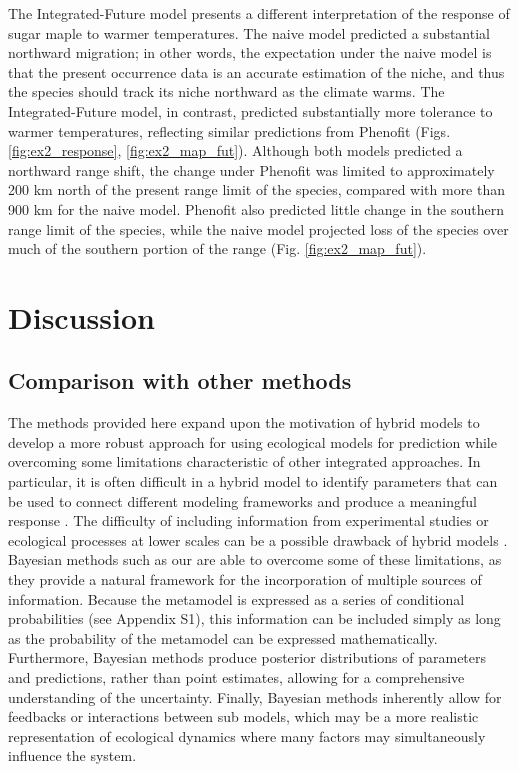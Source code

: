 \documentclass[11pt]{article}
\begin{document}
The Integrated-Future model presents a different interpretation of the response of sugar maple to warmer temperatures. 
The naive model predicted a substantial northward migration; in other words, the expectation under the naive model is that the present occurrence data is an accurate estimation of the niche, and thus the species should track its niche northward as the climate warms.
The Integrated-Future model, in contrast, predicted substantially more tolerance to warmer temperatures, reflecting similar predictions from Phenofit (Figs. \ref{fig:ex2_response}, \ref{fig:ex2_map_fut}).
Although both models predicted a northward range shift, the change under Phenofit was limited to approximately 200 km north of the present range limit of the species, compared with more than 900 km for the naive model.
Phenofit also predicted little change in the southern range limit of the species, while the naive model projected loss of the species over much of the southern portion of the range (Fig. \ref{fig:ex2_map_fut}).



%
%



\section*{Discussion}

\subsection*{Comparison with other methods}
The methods provided here expand upon the motivation of hybrid models to develop a more robust approach for using ecological models for prediction while overcoming some limitations characteristic of other integrated approaches.
In particular, it is often difficult in a hybrid model to identify parameters that can be used to connect different modeling frameworks and produce a meaningful response \citep{Thuiller2013}. 
The difficulty of including information from experimental studies or ecological processes at lower scales can be a possible drawback of hybrid models \citep{Smolik2010, Thuiller2014a}. 
Bayesian methods such as our are able to overcome some of these limitations, as they provide a natural framework for the incorporation of multiple sources of information.
Because the metamodel is expressed as a series of conditional probabilities (see Appendix S1), this information can be included simply as long as the probability of the metamodel can be expressed mathematically.
Furthermore, Bayesian methods produce posterior distributions of parameters and predictions, rather than point estimates, allowing for a comprehensive understanding of the uncertainty. 
Finally, Bayesian methods inherently allow for feedbacks or interactions between sub models, which may be a more realistic representation of ecological dynamics where many factors may simultaneously influence the system.
\end{document}

